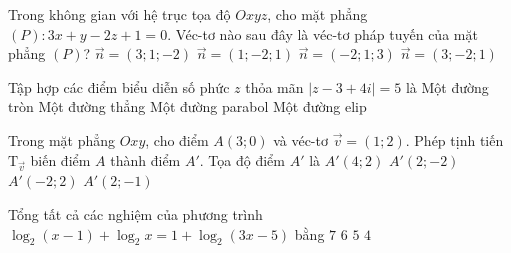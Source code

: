 \begin{ex}%
	Trong không gian với hệ trục tọa độ $Oxyz$, cho mặt phẳng $(P)\colon 3x+y-2z +1=0$. Véc-tơ nào sau đây là véc-tơ pháp tuyến của mặt phẳng $(P)$?
	\choice 
	{\True $\vec{n} =\left(3;1;-2\right)$}
	{$\vec{n} =\left(1;-2;1\right)$}
	{$\vec{n} =\left(-2;1;3\right) $}
	{$\vec{n} =\left(3;-2;1\right)$}
	
\end{ex}
\begin{ex}%
	Tập hợp các điểm biểu diễn số phức $z$ thỏa mãn $\left| z-3+4i\right| =5$ là	
	\choice 
	{\True Một đường tròn}
	{Một đường thẳng}
	{Một đường parabol}
	{Một đường elip}
	
\end{ex}


\begin{ex}%
	Trong mặt phẳng $Oxy$, cho điểm $A(3;0)$ và véc-tơ $\vec{v} =(1;2)$. Phép tịnh tiến $\mathrm{T}_{\vec{v}}$ biến điểm $A$ thành điểm $A'$. Tọa độ điểm $A'$ là 
	\choice 
	{\True $A'(4;2)$}
	{$A'(2;-2)$}
	{$A'(-2;2)$}
	{$A'(2;-1)$}
\end{ex}


\begin{ex}%
	Tổng tất cả các nghiệm của phương trình $\log_2(x-1)+\log_2x =1+\log_2(3x-5)$ bằng	
	\choice 
	{\True $7$}
	{$6$}
	{$5$}
	{$4	$}
\end{ex}


